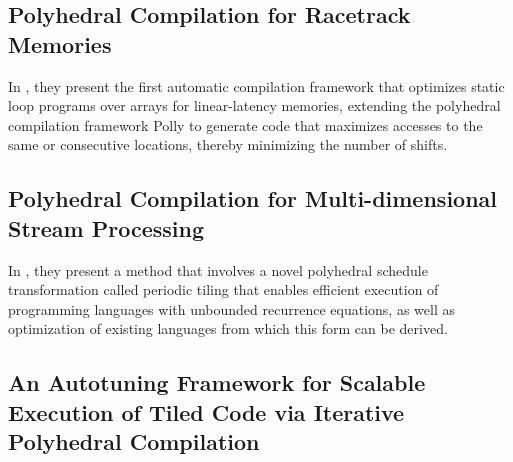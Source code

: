 \subsection{Polyhedral Compilation for Racetrack Memories}
In \cite{khan2020polyhedral}, they present the first automatic compilation framework that optimizes static loop programs over arrays for linear-latency memories, extending the polyhedral compilation framework Polly to generate code that maximizes accesses to the same or consecutive locations, thereby minimizing the number of shifts.

\subsection{Polyhedral Compilation for Multi-dimensional Stream Processing}
In \cite{leben2019polyhedral}, they present a method that involves a novel polyhedral schedule transformation called periodic tiling that enables efficient execution of programming languages with unbounded recurrence equations, as well as optimization of existing languages from which this form can be derived.

\subsection{An Autotuning Framework for Scalable Execution of Tiled Code via Iterative Polyhedral Compilation}

